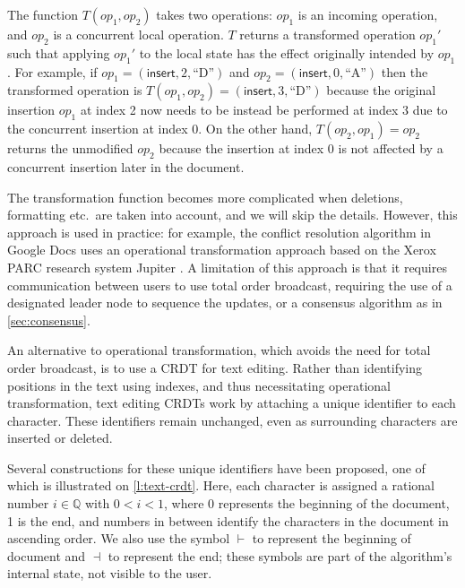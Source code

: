 The function $T(\mathit{op}_1, \mathit{op}_2)$ takes two operations: $\mathit{op}_1$ is an incoming operation, and $\mathit{op}_2$ is a concurrent local operation.
$T$ returns a transformed operation $\mathit{op}_1'$ such that applying $\mathit{op}_1'$ to the local state has the effect originally intended by $\mathit{op}_1$.
For example, if $\mathit{op}_1 = (\mathsf{insert}, 2, \text{``D''})$ and $\mathit{op}_2 = (\mathsf{insert}, 0, \text{``A''})$ then the transformed operation is $T(\mathit{op}_1, \mathit{op}_2) = (\mathsf{insert}, 3, \text{``D''})$ because the original insertion $\mathit{op}_1$ at index 2 now needs to be instead be performed at index 3 due to the concurrent insertion at index 0.
On the other hand, $T(\mathit{op}_2, \mathit{op}_1) = \mathit{op}_2$ returns the unmodified $\mathit{op}_2$ because the insertion at index 0 is not affected by a concurrent insertion later in the document.


The transformation function becomes more complicated when deletions, formatting etc.\ are taken into account, and we will skip the details.
However, this approach is used in practice: for example, the conflict resolution algorithm in Google Docs uses an operational transformation approach based on the Xerox PARC research system Jupiter \citep{Nichols:1995}.
A limitation of this approach is that it requires communication between users to use total order broadcast, requiring the use of a designated leader node to sequence the updates, or a consensus algorithm as in \autoref{sec:consensus}.

An alternative to operational transformation, which avoids the need for total order broadcast, is to use a CRDT for text editing.
Rather than identifying positions in the text using indexes, and thus necessitating operational transformation, text editing CRDTs work by attaching a unique identifier to each character.
These identifiers remain unchanged, even as surrounding characters are inserted or deleted.

Several constructions for these unique identifiers have been proposed, one of which is illustrated on \autoref{l:text-crdt}.
Here, each character is assigned a rational number $i \in \mathbb{Q}$ with $0 < i < 1$, where 0 represents the beginning of the document, 1 is the end, and numbers in between identify the characters in the document in ascending order.
We also use the symbol $\vdash$ to represent the beginning of document and $\dashv$ to represent the end; these symbols are part of the algorithm's internal state, not visible to the user.

